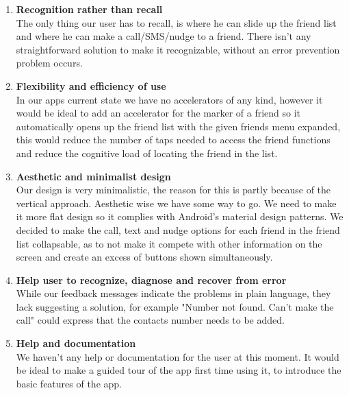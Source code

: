 \documentclass[runningheads,a4paper]{llncs}
\begin{document}
\begin{enumerate}
\item \textbf{Recognition rather than recall}\\
The only thing our user has to recall, is where he can slide up the friend list and where he can make a call/SMS/nudge to a friend. There isn’t any straightforward solution to make it recognizable, without an error prevention problem occurs.
\item \textbf{Flexibility and efficiency of use}\\
In our apps current state we have no accelerators of any kind, however it would be ideal to add an accelerator for the marker of a friend so it automatically opens up the friend list with the given friends menu expanded, this would reduce the number of taps needed to access the friend functions and reduce the cognitive load of locating the friend in the list.
\item \textbf{Aesthetic and minimalist design
}\\
Our design is very minimalistic, the reason for this is partly because of the vertical approach. 
Aesthetic wise we have some way to go. We need to make it more flat design so it complies with Android's material design patterns.
We decided to make the call, text and nudge options for each friend in the friend list collapsable, as to not make it compete with other information on the screen and create an excess of buttons shown simultaneously.
\item \textbf{Help user to recognize, diagnose and recover from error}\\
While our feedback messages indicate the problems in plain language, they lack suggesting a solution, for example "Number not found. Can't make the call" could express that the contacts number needs to be added.
\item \textbf{Help and documentation}\\
We haven’t any help or documentation for the user at this moment. It would be ideal to make a guided tour of the app first time using it, to introduce the basic features of the app. 
\end{enumerate}
\end{document}
